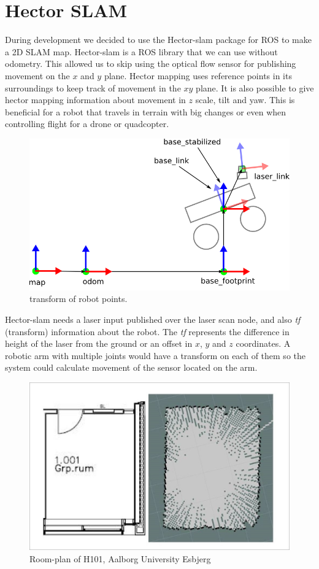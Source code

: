 \section{Hector SLAM}
During development we decided to use the Hector-slam package for ROS to make a 2D SLAM map. Hector-slam is a ROS library that we can use without odometry\cite{hectormapping}.
This allowed us to skip using the optical flow sensor for publishing movement on the $x$ and $y$ plane. Hector mapping uses reference points in its surroundings to keep track of movement in the $xy$ plane. It is also possible to give hector mapping information about movement in $z$ scale, tilt and yaw. This is beneficial for a robot that travels in terrain with big changes or even when controlling flight for a drone or quadcopter.

\begin{figure}[H]
	\centering
	\includegraphics[width=.5\linewidth]{images/tf.png}
	\caption{transform of robot points.\cite{tfrobot}}
	\label{fig:tfrobot}
\end{figure}

Hector-slam needs a laser input published over the laser scan node, and also \textit{tf} (transform) information about the robot. The \textit{tf} represents the difference in height of the laser from the ground or an offset in $x$, $y$ and $z$ coordinates. A robotic arm with multiple joints would have a transform on each of them so the system could calculate movement of the sensor located on the arm.

\begin{figure}[H]
	\centering
	\includegraphics[width=.5\linewidth]{images/compare.jpg}
	\caption{Room-plan of H101, Aalborg University Esbjerg}
	\label{fig:roomplan}
\end{figure}

